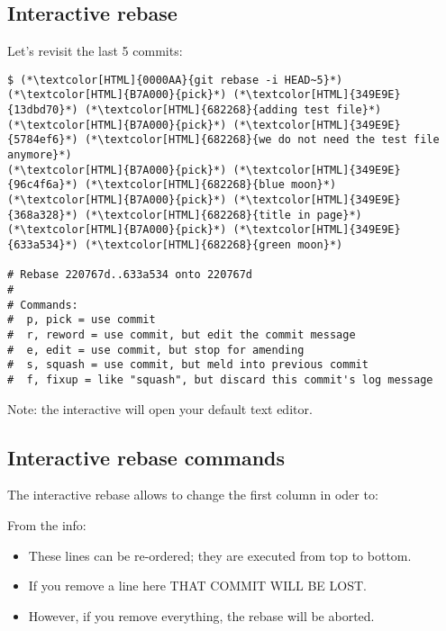 \subsection{Interactive rebase}
\begin{frame}[fragile]
  \subslidetitle

  Let's revisit the last 5 commits:
  \begin{lstlisting}
$ (*\textcolor[HTML]{0000AA}{git rebase -i HEAD~5}*)
(*\textcolor[HTML]{B7A000}{pick}*) (*\textcolor[HTML]{349E9E}{13dbd70}*) (*\textcolor[HTML]{682268}{adding test file}*)
(*\textcolor[HTML]{B7A000}{pick}*) (*\textcolor[HTML]{349E9E}{5784ef6}*) (*\textcolor[HTML]{682268}{we do not need the test file anymore}*)
(*\textcolor[HTML]{B7A000}{pick}*) (*\textcolor[HTML]{349E9E}{96c4f6a}*) (*\textcolor[HTML]{682268}{blue moon}*)
(*\textcolor[HTML]{B7A000}{pick}*) (*\textcolor[HTML]{349E9E}{368a328}*) (*\textcolor[HTML]{682268}{title in page}*)
(*\textcolor[HTML]{B7A000}{pick}*) (*\textcolor[HTML]{349E9E}{633a534}*) (*\textcolor[HTML]{682268}{green moon}*)

# Rebase 220767d..633a534 onto 220767d
#
# Commands:
#  p, pick = use commit
#  r, reword = use commit, but edit the commit message
#  e, edit = use commit, but stop for amending
#  s, squash = use commit, but meld into previous commit
#  f, fixup = like "squash", but discard this commit's log message
\end{lstlisting}

  Note: the interactive  will open your default text editor.
\end{frame}

\subsection{Interactive rebase commands}
\begin{frame}[fragile]
  \subslidetitle

  The interactive rebase allows to change the first column in oder to:

  \begin{itemize}
  \end{itemize}

  \vspace{1em}
  From the  info:
  \begin{itemize}
    \item These lines can be re-ordered; they are executed from top to bottom.
    \item If you remove a line here THAT COMMIT WILL BE LOST.
    \item However, if you remove everything, the rebase will be aborted.
  \end{itemize}

\end{frame}

